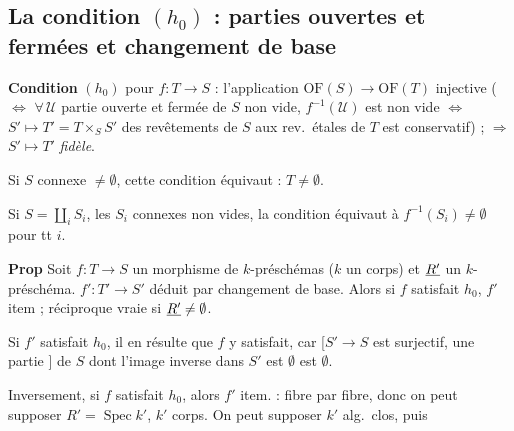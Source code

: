 \documentclass[11pt,a4paper]{article}
\begin{document}
\subsection{La condition $(h_0)$ : parties ouvertes et fermées et changement de base}

\textbf{Condition} \struck{\ill{}} $(h_0)$ pour $f : T \to S$ : l'application
$\mathrm{OF}(S) \to \mathrm{OF}(T)$ injective ($\Longleftrightarrow$ $\forall\,\mathcal{U}$
partie ouverte et fermée de $S$ non vide, $f^{-1}(\mathcal{U})$ est non vide
$\Longleftrightarrow$ $S' \mapsto T' = T \times_S S'$ des revêtements de $S$
aux rev.\ étales de $T$ est  conservatif) ; $\Longrightarrow$
$S' \mapsto T'$   \emph{fidèle}.

Si $S$ connexe $\neq \emptyset$, cette condition équivaut : $T \neq \emptyset$.

Si $S = \coprod_i S_i$, les $S_i$ connexes non vides, la condition
équivaut à $f^{-1}(S_i) \neq \emptyset$ pour tt $i$.


\textbf{Prop}  Soit $f : T \to S$ un morphisme de
$k$-préschémas ($k$ un corps) et $\uncertain{R'}$ un $k$-préschéma.
 $f' : T' \to S'$ déduit par changement de
base. Alors si $f$ satisfait $h_0$,  $f'$  item ;
réciproque vraie si $\uncertain{R'} \neq \emptyset$.

Si $f'$ satisfait $h_0$, il en résulte que $f$ y satisfait, car [$S' \to S$
est surjectif, une partie ] de $S$ dont
l'image inverse dans $S'$ est $\emptyset$ est $\emptyset$.

Inversement, si $f$ satisfait $h_0$, alors $f'$ item.  : \struck{\ill{}} fibre par fibre, donc on peut supposer
$R' = \operatorname{Spec} k'$, $k'$ corps. On peut supposer $k'$ alg.\ clos,
puis 
\end{document}
